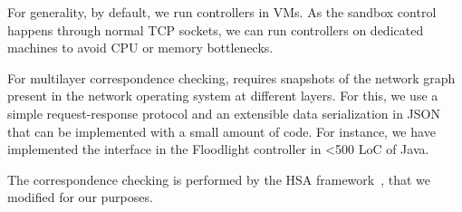 For generality, by default, we run controllers in VMs. As the sandbox control
happens through normal TCP sockets, we can run controllers on dedicated machines
to avoid CPU or memory bottlenecks.


For multilayer correspondence checking, \projectname requires snapshots of the
network graph present in the network operating system at different layers. For this,
we use a simple request-response protocol and an extensible data serialization in
JSON that can be implemented with a small amount of code. For instance, we have
implemented the interface in the Floodlight controller in <500 LoC of Java.

The correspondence checking is performed by the HSA framework~\cite{hsa}, that
we modified for our purposes. 

